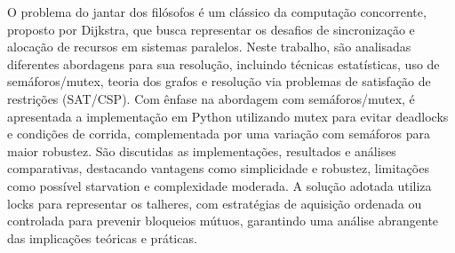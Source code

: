 O problema do jantar dos filósofos é um clássico da computação concorrente, proposto por Dijkstra, que busca representar os desafios de sincronização e alocação de recursos em sistemas paralelos. Neste trabalho, são analisadas diferentes abordagens para sua resolução, incluindo técnicas estatísticas, uso de semáforos/mutex, teoria dos grafos e resolução via problemas de satisfação de restrições (SAT/CSP). Com ênfase na abordagem com semáforos/mutex, é apresentada a implementação em Python utilizando mutex para evitar deadlocks e condições de corrida, complementada por uma variação com semáforos para maior robustez. São discutidas as implementações, resultados e análises comparativas, destacando vantagens como simplicidade e robustez, limitações como possível starvation e complexidade moderada. A solução adotada utiliza locks para representar os talheres, com estratégias de aquisição ordenada ou controlada para prevenir bloqueios mútuos, garantindo uma análise abrangente das implicações teóricas e práticas.